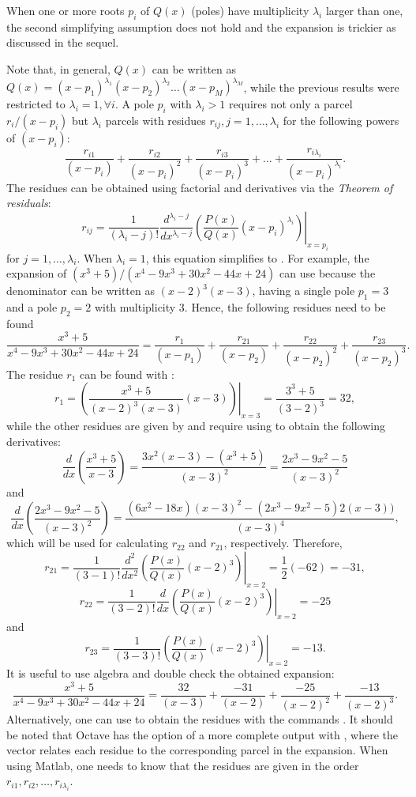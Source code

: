 When one or more roots $p_i$ of $Q(x)$ (poles) have multiplicity $\lambda_i$ larger than one, the second simplifying assumption does not hold and the expansion is trickier as discussed in the sequel. 

Note that, in general, $Q(x)$ can be written as
$Q(x)=(x-p_1)^{\lambda_1} (x-p_2)^{\lambda_2} \ldots (x-p_M)^{\lambda_M}$, while the previous results were restricted to $\lambda_i=1, \forall i$. A pole $p_i$ with $\lambda_i > 1$ requires not only a parcel $r_i/(x-p_i)$ but $\lambda_i$ parcels with residues $r_{ij}, j=1,\ldots,\lambda_i$ for the following powers of $(x-p_i)$:
\[
\frac{r_{i1}}{(x-p_i)} + \frac{r_{i2}}{(x-p_i)^2} + \frac{r_{i3}}{(x-p_i)^3} + \ldots + \frac{r_{i {\lambda_i}}}{(x-p_i)^{\lambda_i}}.
\]
The residues can be obtained using factorial and derivatives via the \emph{Theorem of residuals}:
\begin{equation}
r_{ij} = \frac{1}{(\lambda_i - j)!} \left. \frac{d^{\lambda_i - j}}{dx^{\lambda_i - j}} \left( \frac{P(x)}{Q(x)}(x-p_i)^{\lambda_i}\right) \right|_{x=p_i}
\label{eq:residue_general}
\end{equation}
for $j=1,\ldots,\lambda_i$. When $\lambda_i=1$, this equation simplifies to . For example, the expansion of $(x^3+5)/(x^4-9x^3+30x^2-44x+24)$ can use  because the denominator can be written as $(x-2)^3(x-3)$, having a single pole $p_1=3$ and a pole $p_2=2$ with multiplicity 3. Hence, the following residues need to be found
\[
\frac{x^3+5}{x^4-9x^3+30x^2-44x+24}=\frac{r_{1}}{(x-p_1)} + \frac{r_{21}}{(x-p_2)} + \frac{r_{22}}{(x-p_2)^2} + \frac{r_{23}}{(x-p_2)^3}.
\]
The residue $r_1$ can be found with :
\[
r_1 = \left. \left( \frac{x^3+5}{(x-2)^3(x-3)}(x-3) \right) \right|_{x=3} = \frac{3^3+5}{(3-2)^3} = 32,
\]
while the other residues are given by  and require using  to obtain the following derivatives:
\[
\frac{d}{dx} \left( \frac{x^3+5}{x-3} \right) = \frac{3x^2(x-3)-(x^3+5)}{(x-3)^2} = \frac{2x^3-9x^2-5}{(x-3)^2}
\]
and
\[
\frac{d}{dx} \left( \frac{2x^3-9x^2-5}{(x-3)^2} \right) = \frac{(6x^2-18x)(x-3)^2-(2x^3-9x^2-5)2(x-3))}{(x-3)^4}, 
\]
which will be used for calculating $r_{22}$ and $r_{21}$, respectively.
Therefore,
\[
r_{21} = \frac{1}{(3 - 1)!} \left. \frac{d^{2}}{dx^{2}} \left( \frac{P(x)}{Q(x)}(x-2)^{3}\right) \right|_{x=2} = \frac{1}{2} (-62) = -31,
\]
\[
r_{22} = \frac{1}{(3 - 2)!} \left. \frac{d}{dx} \left( \frac{P(x)}{Q(x)}(x-2)^{3}\right) \right|_{x=2} = -25
\]
and
\[
r_{23} = \frac{1}{(3 - 3)!} \left. \left( \frac{P(x)}{Q(x)}(x-2)^{3}\right) \right|_{x=2} = -13.
\]
It is useful to use algebra and double check the obtained expansion:
\[
\frac{x^3+5}{x^4-9x^3+30x^2-44x+24}=\frac{32}{(x-3)} + \frac{-31}{(x-2)} + \frac{-25}{(x-2)^2} + \frac{-13}{(x-2)^3}.
\]
Alternatively, one can use {\matlab} to obtain the residues with the commands . It should be noted that Octave has the option of a more complete output with , where the vector  relates each residue to the corresponding parcel in the expansion. When using Matlab, one needs to know that the residues are given in the order $r_{i1},r_{i2},\ldots,r_{i \lambda_i}$.

